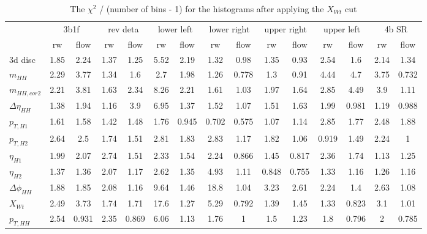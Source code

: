 \begin{table}
\centering\begin{adjustbox}{width=\columnwidth,center}
\label{tab:chi2_ndf_Xwt_cut}
\begin{tabular}{lcccccccccccccc}
\toprule
{} & \multicolumn{2}{c}{3b1f} & \multicolumn{2}{c}{rev deta} & \multicolumn{2}{c}{lower left} & \multicolumn{2}{c}{lower right} & \multicolumn{2}{c}{upper right} & \multicolumn{2}{c}{upper left} & \multicolumn{2}{c}{4b SR} \\
{} &   rw &  flow &       rw &  flow &         rw &  flow &          rw &  flow &          rw &  flow &         rw &  flow &    rw &  flow \\
\midrule
3d disc            & 1.85 &  2.24 &     1.37 &  1.25 &       5.52 &  2.19 &        1.32 &  0.98 &        1.35 &  0.93 &       2.54 &   1.6 &  2.14 &  1.34 \\
$m_{HH}$           & 2.29 &  3.77 &     1.34 &   1.6 &        2.7 &  1.98 &        1.26 & 0.778 &         1.3 &  0.91 &       4.44 &   4.7 &  3.75 & 0.732 \\
$m_{HH,cor2}$      & 2.21 &  3.81 &     1.63 &  2.34 &       8.26 &  2.21 &        1.61 &  1.03 &        1.97 &  1.64 &       2.85 &  4.49 &   3.9 &  1.11 \\
$\Delta \eta_{HH}$ & 1.38 &  1.94 &     1.16 &   3.9 &       6.95 &  1.37 &        1.52 &  1.07 &        1.51 &  1.63 &       1.99 & 0.981 &  1.19 & 0.988 \\
$p_{T,H1}$         & 1.61 &  1.58 &     1.42 &  1.48 &       1.76 & 0.945 &       0.702 & 0.575 &        1.07 &  1.14 &       2.85 &  1.77 &  2.48 &  1.88 \\
$p_{T,H2}$         & 2.64 &   2.5 &     1.74 &  1.51 &       2.81 &  1.83 &        2.83 &  1.17 &        1.82 &  1.06 &      0.919 &  1.49 &  2.24 &     1 \\
$\eta_{H1}$        & 1.99 &  2.07 &     2.74 &  1.51 &       2.33 &  1.54 &        2.24 & 0.866 &        1.45 & 0.817 &       2.36 &  1.74 &  1.13 &  1.25 \\
$\eta_{H2}$        & 1.37 &  1.36 &     2.07 &  1.17 &       2.62 &  1.35 &        4.93 &  1.11 &       0.848 & 0.755 &       1.33 &  1.16 &  1.26 &  1.16 \\
$\Delta \phi_{HH}$ & 1.88 &  1.85 &     2.08 &  1.16 &       9.64 &  1.46 &        18.8 &  1.04 &        3.23 &  2.61 &       2.24 &   1.4 &  2.63 &  1.08 \\
$X_{Wt}$           & 2.49 &  3.73 &     1.74 &  1.71 &       17.6 &  1.27 &        5.29 & 0.792 &        1.39 &  1.45 &       1.33 & 0.823 &   3.1 &  1.01 \\
$p_{T,HH}$         & 2.54 & 0.931 &     2.35 & 0.869 &       6.06 &  1.13 &        1.76 &     1 &         1.5 &  1.23 &        1.8 & 0.796 &     2 & 0.785 \\
\bottomrule
\end{tabular}
\end{adjustbox}\caption{The $\chi^2$ / (number of bins - 1) for the histograms after applying the $X_{Wt}$ cut}\end{table}
